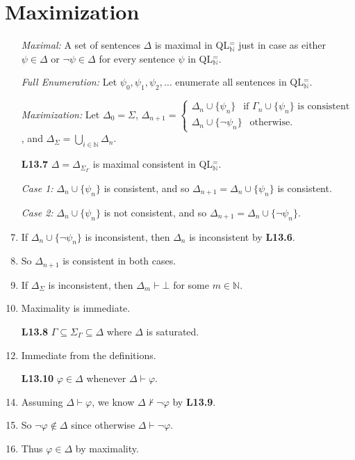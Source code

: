 \documentclass[a4paper, 11pt]{article} %
\def\proves{\ensuremath{\vdash}}
\def\nproves{\ensuremath{\nvdash}}
\newcommand{\set}[1]{\lbrace#1\rbrace} %
\newcommand{\N}{\mathbb{N}}
\def\metaA{\ensuremath{\varphi}}
\def\metaB{\ensuremath{\psi}}
\begin{document}
\section*{Maximization}

\begin{enumerate}
  \item[\it Maximal:] A set of sentences $\Delta$ is maximal in QL$^=_{\N}$ just in case as either $\metaB\in\Delta$ or $\neg\metaB\in\Delta$ for every sentence $\metaB$ in QL$^=_{\N}$.
  \item[\it Full Enumeration:] Let $\metaB_0,\metaB_1,\metaB_2,\ldots$ enumerate all sentences in QL$^=_{\N}$.
  \item[\it Maximization:] Let $\Delta_0 = \Sigma$, 
    $\Delta_{n+1} =
      \begin{cases}
        \Delta_n\cup\set{\metaB_n} ~~\text{ if } \Gamma_n\cup\set{\metaB_n} \text{ is consistent}\\
        \Delta_n\cup\set{\neg\metaB_n} ~~\text{ otherwise}.
      \end{cases}$,
    \vspace{-.05in}
    and $\Delta_\Sigma = \bigcup_{i\in\N}\Delta_n$. 
  \item[\bf L13.7] $\Delta=\Delta_{\Sigma_\Gamma}$ is maximal consistent in QL$^=_{\N}$.
  \item[\it Case 1:] $\Delta_n\cup\set{\metaB_n}$ is consistent, and so $\Delta_{n+1}=\Delta_n\cup\set{\metaB_n}$ is consistent. 
  \item[\it Case 2:] $\Delta_n\cup\set{\metaB_n}$ is not consistent, and so $\Delta_{n+1}=\Delta_n\cup\set{\neg\metaB_n}$.
  \item If $\Delta_n\cup\set{\neg\metaB_n}$ is inconsistent, then $\Delta_n$ is inconsistent by \textbf{L13.6}. 
  \item So $\Delta_{n+1}$ is consistent in both cases. 
  \item If $\Delta_\Sigma$ is inconsistent, then $\Delta_m\proves\bot$ for some $m\in\N$.
  \item Maximality is immediate.
  \item[\bf L13.8] $\Gamma\subseteq\Sigma_\Gamma\subseteq\Delta$ where $\Delta$ is saturated.
    \setcounter{enumi}{0}
  \item Immediate from the definitions.
  \item[\bf L13.10] $\metaA\in\Delta$ whenever $\Delta\proves\metaA$.
    \setcounter{enumi}{0}
  \item Assuming $\Delta\proves\metaA$, we know $\Delta\nproves\neg\metaA$ by \textbf{L13.9}.
  \item So $\neg\metaA\notin\Delta$ since otherwise $\Delta\proves\neg\metaA$.
  \item Thus $\metaA\in\Delta$ by maximality. 
\end{enumerate}
\end{document}

